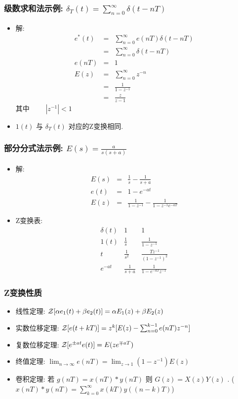 \documentclass[table]{beamer}
\begin{document}
\begin{frame}
\frametitle{级数求和法示例: $\delta_T(t)=\sum_{n=0}^{\infty}\delta(t-nT)$}
\label{sec-3-1-4}

\begin{itemize}
\item <2->解:
      \begin{eqnarray*}
      e^*(t) & = & \sum_{n=0}^{\infty}e(nT)\delta(t-nT) \\
       &=& \sum_{n=0}^{\infty}\delta(t-nT) \\
      e(nT) &=& 1\\
      E(z) &=& \sum_{n=0}^{\infty}z^{-n}\\
       &=& \frac{1}{1-z^{-1}} \\
      &=& \frac{z}{z-1}
     \end{eqnarray*}
      其中 $\qquad |z^{-1}|<1$
\item <3->$1(t)$  与  $\delta_T(t)$  对应的Z变换相同.
\end{itemize}
\end{frame}
\begin{frame}
\frametitle{部分分式法示例:  $E(s)=\frac{a}{s(s+a)}$}
\label{sec-3-1-5}

\begin{itemize}
\item <2->解:
      \begin{eqnarray*}
      E(s) & = & \frac{1}{s}-\frac{1}{s+a}\\
      e(t) &=& 1-e^{-at} \\
      E(z) &=& \frac{1}{1-z^{-1}} -\frac{1}{1-z^{-1}e^{-aT}}
      \end{eqnarray*}
\item <3->Z变换表:
      \[\begin{matrix}
      \delta(t) & 1 & 1 \\
      1(t) & \frac{1}{s} & \frac{1}{1-z^{-1}} \\
      t & \frac{1}{s^2} & \frac{Tz^{-1}}{(1-z^{-1})^2} \\
      e^{-at} & \frac{1}{s+a} &\frac{1}{1-e^{-aT}z^{-1}}
      \end{matrix}\]
\end{itemize}
\end{frame}
\begin{frame}
\frametitle{Z变换性质}
\label{sec-3-1-6}

\begin{itemize}
\item <2->线性定理:    ${\cal Z}[\alpha e_1(t)+\beta e_2(t)]=\alpha E_1(z)+\beta E_2(z)$
\item <3->实数位移定理:  ${\cal Z}[e(t+kT)] = z^k[E(z)-\sum_{n=0}^{k-1}e(nT)z^{-n}]$
\item <4->复数位移定理:  ${\cal Z}[e^{\pm at}e(t)] = E(ze^{\mp aT})$
\item <5->终值定理:  $\lim_{n\rightarrow\infty}e(nT)=\lim_{z\rightarrow 1}(1-z^{-1})E(z)$
\item <6->卷积定理: 若  $g(nT)=x(nT)*y(nT)$  则  $G(z)=X(z)Y(z)$  . ($x(nT)*y(nT)=\sum_{k=0}^{\infty}x(kT)y((n-k)T)$)
\end{itemize}
\end{frame}
\end{document}
